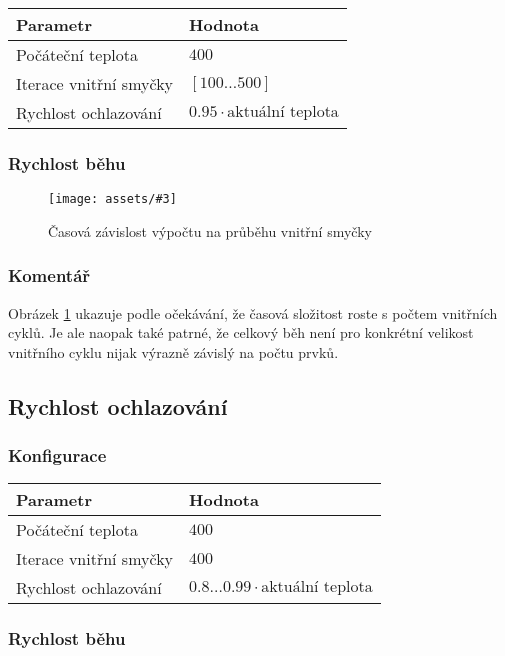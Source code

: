 \documentclass[czech]{article}
\newcommand{\image}[3]{
    \begin{figure}[H]
        \centering
        \texttt{[image: assets/\#3]}
        \caption{#2}
        \label{fig:#1}
    \end{figure}
}
\begin{document}
\begin{tabular}{ | l | l | }
    \hline
    Parametr & Hodnota \\ \hline \hline
    Počáteční teplota & $400$ \\
    Iterace vnitřní smyčky & $[100\dots500]$ \\
    Rychlost ochlazování & $0.95 \cdot \textrm{aktuální teplota}$ \\ \hline
\end{tabular}

\subsubsection*{Rychlost běhu}

\image{equilibrium}{Časová závislost výpočtu na průběhu vnitřní smyčky}{equilibrium.png}

\subsubsection*{Komentář}

Obrázek \ref{fig:equilibrium} ukazuje podle očekávání, že časová složitost roste s počtem vnitřních cyklů.
Je ale naopak také patrné, že celkový běh není pro konkrétní velikost vnitřního cyklu nijak výrazně závislý na počtu prvků.

\subsection{Rychlost ochlazování}

\subsubsection*{Konfigurace}

\begin{tabular}{ | l | l | }
    \hline
    Parametr & Hodnota \\ \hline \hline
    Počáteční teplota & $400$ \\
    Iterace vnitřní smyčky & $400$ \\
    Rychlost ochlazování & $0.8\dots0.99 \cdot \textrm{aktuální teplota}$ \\ \hline
\end{tabular}

\subsubsection*{Rychlost běhu}
\end{document}

